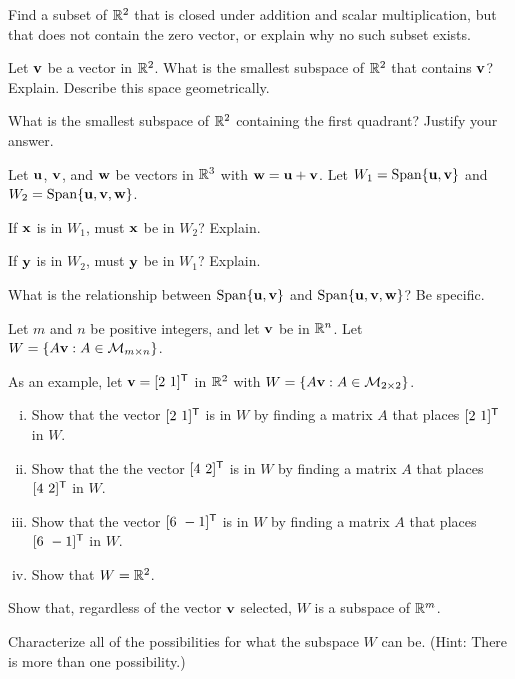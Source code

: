 \item Find a subset of $\mathbb{R}^2$ that is closed under addition and scalar multiplication, but that does not contain the zero vector, or explain why no such subset exists. 

\item Let $\mathbf{v}$ be a vector in $\mathbb{R}^2$. What is the smallest subspace of $\mathbb{R}^2$ that contains $\mathbf{v}$? Explain. Describe this space geometrically. 

\item What is the smallest subspace of $\mathbb{R}^2$ containing the first quadrant? Justify your answer. 

\item Let $\mathbf{u}$, $\mathbf{v}$, and $\mathbf{w}$ be vectors in $\mathbb{R}^3$ with $\mathbf{w} = \mathbf{u}+\mathbf{v}$. Let $W_1 = \text{Span}\{\mathbf{u},\mathbf{v}\}$ and $W_2 = \text{Span}\{\mathbf{u},\mathbf{v},\mathbf{w}\}$. 
\ba
\item If $\mathbf{x}$ is in $W_1$, must $\mathbf{x}$ be in $W_2$? Explain.

\item If $\mathbf{y}$ is in $W_2$, must $\mathbf{y}$ be in $W_1$? Explain.

\item What is the relationship between $\text{Span}\{\mathbf{u},\mathbf{v}\}$ and $\text{Span}\{\mathbf{u},\mathbf{v},\mathbf{w}\}$? Be specific. 

\ea

\item Let $m$ and $n$ be positive integers, and let $\mathbf{v}$ be in $\mathbb{R}^n$. Let $W = \{A\mathbf{v} : A \in \mathcal{M}_{m \times n}\}$. 
\ba
\item As an example, let $\vv = [2 \ 1]^{\tr}$ in $\mathbb{R}^2$ with $W = \{A\mathbf{v} : A \in \mathcal{M}_{2 \times 2}\}$. 
	\begin{enumerate}[i.]
	\item Show that the vector $[2 \ 1]^{\tr}$ is in $W$ by finding a matrix $A$ that places $[2 \ 1]^{\tr}$ in $W$.  
	\item Show that the the vector $[4 \ 2]^{\tr}$ is in $W$ by finding a matrix $A$ that places $[4 \ 2]^{\tr}$ in $W$. 
	\item Show that the vector $[6 \ -1]^{\tr}$ is in $W$ by finding a matrix $A$ that places $[6 \ -1]^{\tr}$ in $W$. 
	\item Show that $W = \mathbb{R}^2$. 
	\end{enumerate}
	
\item Show that, regardless of the vector $\mathbf{v}$ selected, $W$ is a subspace of $\mathbb{R}^m$. 

\item Characterize all of the possibilities for what the subspace $W$ can be. (Hint: There is more than one possibility.)

